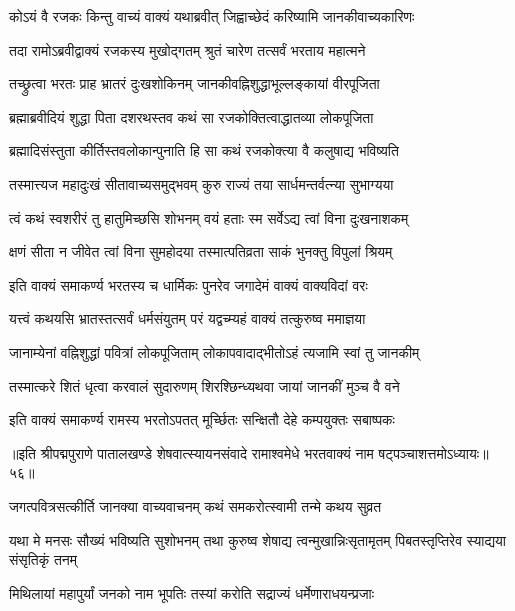 \twolineshloka
{कोऽयं वै रजकः किन्तु वाच्यं वाक्यं यथाब्रवीत्}
{जिह्वाच्छेदं करिष्यामि जानकीवाच्यकारिणः}%

\twolineshloka
{तदा रामोऽब्रवीद्वाक्यं रजकस्य मुखोद्गतम्}
{श्रुतं चारेण तत्सर्वं भरताय महात्मने}%

\twolineshloka
{तच्छ्रुत्वा भरतः प्राह भ्रातरं दुःखशोकिनम्}
{जानकीवह्निशुद्धाभूल्लङ्कायां वीरपूजिता}%

\twolineshloka
{ब्रह्माब्रवीदियं शुद्धा पिता दशरथस्तव}
{कथं सा रजकोक्तित्वाद्धातव्या लोकपूजिता}%

\twolineshloka
{ब्रह्मादिसंस्तुता कीर्तिस्तवलोकान्पुनाति हि}
{सा कथं रजकोक्त्या वै कलुषाद्य भविष्यति}%

\twolineshloka
{तस्मात्त्यज महादुःखं सीतावाच्यसमुद्भवम्}
{कुरु राज्यं तया सार्धमन्तर्वत्न्या सुभाग्यया}%

\twolineshloka
{त्वं कथं स्वशरीरं तु हातुमिच्छसि शोभनम्}
{वयं हताः स्म सर्वेऽद्य त्वां विना दुःखनाशकम्}%

\twolineshloka
{क्षणं सीता न जीवेत त्वां विना सुमहोदया}
{तस्मात्पतिव्रता साकं भुनक्तु विपुलां श्रियम्}%

\twolineshloka
{इति वाक्यं समाकर्ण्य भरतस्य च धार्मिकः}
{पुनरेव जगादेमं वाक्यं वाक्यविदां वरः}%

\twolineshloka
{यत्त्वं कथयसि भ्रातस्तत्सर्वं धर्मसंयुतम्}
{परं यद्वच्म्यहं वाक्यं तत्कुरुष्व ममाज्ञया}%

\twolineshloka
{जानाम्येनां वह्निशुद्धां पवित्रां लोकपूजिताम्}
{लोकापवादाद्भीतोऽहं त्यजामि स्वां तु जानकीम्}%

\twolineshloka
{तस्मात्करे शितं धृत्वा करवालं सुदारुणम्}
{शिरश्छिन्ध्यथवा जायां जानकीं मुञ्च वै वने}%

\twolineshloka
{इति वाक्यं समाकर्ण्य रामस्य भरतोऽपतत्}
{मूर्च्छितः सन्क्षितौ देहे कम्पयुक्तः सबाष्पकः}%

{॥इति श्रीपद्मपुराणे पातालखण्डे शेषवात्स्यायनसंवादे रामाश्वमेधे भरतवाक्यं नाम षट्पञ्चाशत्तमोऽध्यायः॥५६॥}

\resetShloka


\twolineshloka
{जगत्पवित्रसत्कीर्ति जानक्या वाच्यवाचनम्}
{कथं समकरोत्स्वामी तन्मे कथय सुव्रत}%


\threelineshloka
{यथा मे मनसः सौख्यं भविष्यति सुशोभनम्}
{तथा कुरुष्व शेषाद्य त्वन्मुखान्निःसृतामृतम्}
{पिबतस्तृप्तिरेव स्याद्यया संसृतिकृं तनम्}%


\twolineshloka
{मिथिलायां महापुर्यां जनको नाम भूपतिः}
{तस्यां करोति सद्राज्यं धर्मेणाराधयन्प्रजाः}%

